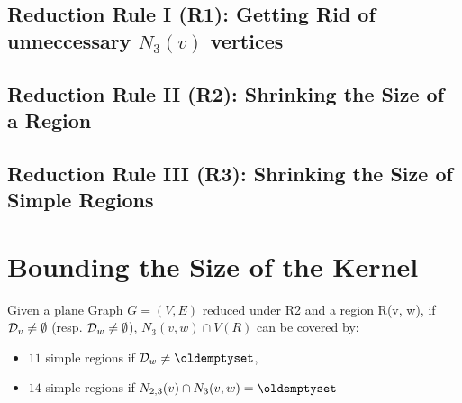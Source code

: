 \subsection{Reduction Rule I (R1): Getting Rid of unneccessary $N_3(v)$ vertices}

\begin{lemma}
    
\end{lemma}

\subsection{Reduction Rule II (R2): Shrinking the Size of a Region}
\begin{lemma}
    
\end{lemma}

\subsection{ Reduction Rule III (R3): Shrinking the Size of Simple Regions}
\begin{lemma}
    
\end{lemma}

\begin{lemma}
    
\end{lemma}


\begin{lemma} 
    
\end{lemma}

\section{Bounding the Size of the Kernel}


\begin{lemma}
   Given a plane Graph $G = (V,E)$ reduced under R2 and a region R(v, w), if $\mathcal{D}_{v} \neq \emptyset $ (resp. $\mathcal{D}_{w} \neq \emptyset$), $N_3(v,w) \cap V(R)$ can be covered by: 
   \begin{itemize}
    \item $11$ simple regions if $\Dw \neq \o$, 
    \item $14$ simple regions if $N_{2,3}(v) \cap N_3(v,w) = \o$
   \end{itemize}
\end{lemma}

